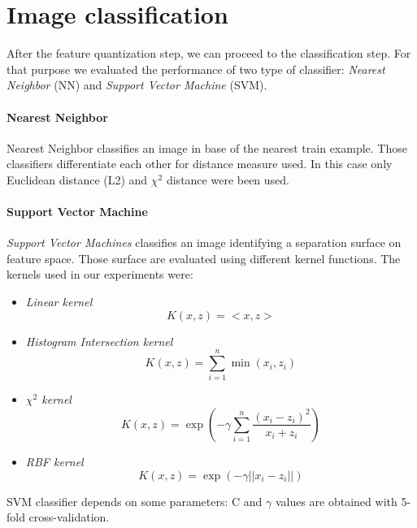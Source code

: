 \section{Image classification}

After the feature quantization step, we can proceed to the classification step. For that purpose we evaluated the performance of two type of classifier: \emph{Nearest Neighbor} (NN) and \emph{Support Vector Machine} (SVM).

\paragraph{Nearest Neighbor}

Nearest Neighbor classifies an image in base of the nearest train example. Those classifiers differentiate each other for distance measure used. In this case only Euclidean distance (L2) and $\chi^2$ distance were been used.

\paragraph{Support Vector Machine}

\emph{Support Vector Machines} classifies an image identifying a separation surface on feature space. Those surface are evaluated using different kernel functions. The kernels used in our experiments were:
\begin{itemize}
\item \emph{Linear kernel}
\begin{equation}
K(x, z) = <x, z>
\end{equation}
\item \emph{Histogram Intersection kernel}
\begin{equation}
K(x, z) = \sum_{i = 1}^{n} \min (x_i, z_i)
\end{equation}
\item \emph{$\chi^2$ kernel}
\begin{equation}
K(x, z) = \exp (-\gamma \sum_{i = 1}^{n} \frac{(x_i - z_i)^2}{x_i + z_i})
\end{equation}
\item \emph{RBF kernel}
\begin{equation}
K(x, z) = \exp (- \gamma ||x_i - z_i||)
\end{equation}
\end{itemize}
SVM classifier depends on some parameters: C and $\gamma$ values are obtained with 5-fold cross-validation.